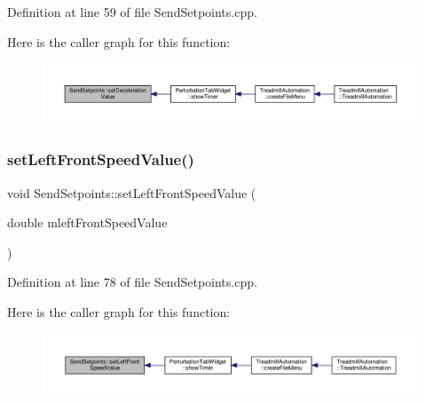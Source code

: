 Definition at line 59 of file Send\+Setpoints.\+cpp.

Here is the caller graph for this function\+:
\nopagebreak
\begin{figure}[H]
\begin{center}
\leavevmode
\includegraphics[width=350pt]{class_send_setpoints_a5993c64b755726a1b618fba58537aee6_icgraph}
\end{center}
\end{figure}
\mbox{\label{class_send_setpoints_af592798b90015754fd11c7ae6493bed7}} 
\subsubsection{\texorpdfstring{set\+Left\+Front\+Speed\+Value()}{setLeftFrontSpeedValue()}}
{\footnotesize\ttfamily void Send\+Setpoints\+::set\+Left\+Front\+Speed\+Value (\begin{DoxyParamCaption}\item[{double}]{mleft\+Front\+Speed\+Value }\end{DoxyParamCaption})}



Definition at line 78 of file Send\+Setpoints.\+cpp.

Here is the caller graph for this function\+:
\nopagebreak
\begin{figure}[H]
\begin{center}
\leavevmode
\includegraphics[width=350pt]{class_send_setpoints_af592798b90015754fd11c7ae6493bed7_icgraph}
\end{center}
\end{figure}
\mbox{\label{class_send_setpoints_af0a9adc63a95f5c4e3d462862864e0fb}} 
